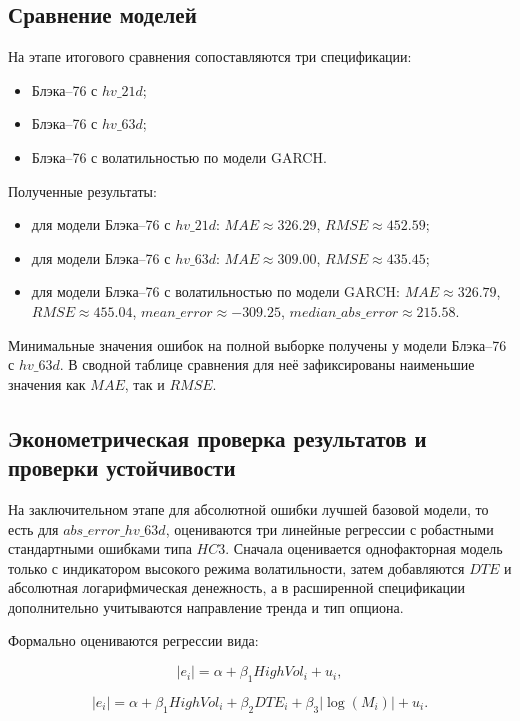 \documentclass[11pt,a4paper]{article}
\begin{document}
\subsection{Сравнение моделей}

На этапе итогового сравнения сопоставляются три спецификации:
\begin{itemize}
    \item Блэка--76 с $hv\_21d$;
    \item Блэка--76 с $hv\_63d$;
    \item Блэка--76 с волатильностью по модели GARCH.
\end{itemize}

Полученные результаты:
\begin{itemize}
    \item для модели Блэка--76 с $hv\_21d$: $MAE \approx 326.29$, $RMSE \approx 452.59$;
    \item для модели Блэка--76 с $hv\_63d$: $MAE \approx 309.00$, $RMSE \approx 435.45$;
    \item для модели Блэка--76 с волатильностью по модели GARCH: $MAE \approx 326.79$, $RMSE \approx 455.04$, $mean\_error \approx -309.25$, $median\_abs\_error \approx 215.58$.
\end{itemize}

Минимальные значения ошибок на полной выборке получены у модели Блэка--76 с $hv\_63d$. В сводной таблице сравнения для неё зафиксированы наименьшие значения как $MAE$, так и $RMSE$.

\subsection{Эконометрическая проверка результатов и проверки устойчивости}

На заключительном этапе для абсолютной ошибки лучшей базовой модели, то есть для $abs\_error\_{hv\_63d}$, оцениваются три линейные регрессии с робастными стандартными ошибками типа $HC3$. Сначала оценивается однофакторная модель только с индикатором высокого режима волатильности, затем добавляются $DTE$ и абсолютная логарифмическая денежность, а в расширенной спецификации дополнительно учитываются направление тренда и тип опциона.

Формально оцениваются регрессии вида:

\begin{equation}
|e_i| = \alpha + \beta_1 HighVol_i + u_i,
\end{equation}

\begin{equation}
|e_i| = \alpha + \beta_1 HighVol_i + \beta_2 DTE_i + \beta_3 |\log(M_i)| + u_i.
\end{equation}
\end{document}
